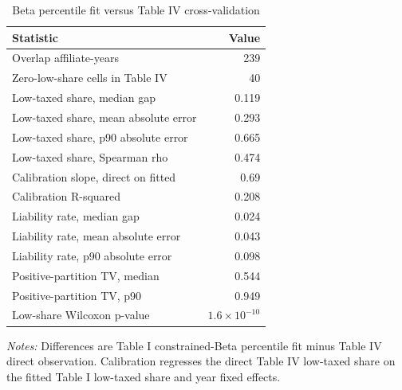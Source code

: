 \begin{table}[H]
\centering
\small
\caption[Beta percentile fit versus Table IV cross-validation]{Beta percentile fit versus Table IV cross-validation}
\label{tab:app_stage1_crossval}
\begin{tabular}{@{}lr@{}}
\toprule
Statistic & Value \\
\midrule
Overlap affiliate-years & 239 \\
Zero-low-share cells in Table IV & 40 \\
Low-taxed share, median gap & 0.119 \\
Low-taxed share, mean absolute error & 0.293 \\
Low-taxed share, p90 absolute error & 0.665 \\
Low-taxed share, Spearman rho & 0.474 \\
Calibration slope, direct on fitted & 0.69 \\
Calibration R-squared & 0.208 \\
Liability rate, median gap & 0.024 \\
Liability rate, mean absolute error & 0.043 \\
Liability rate, p90 absolute error & 0.098 \\
Positive-partition TV, median & 0.544 \\
Positive-partition TV, p90 & 0.949 \\
Low-share Wilcoxon p-value & $1.6 \times 10^{-10}$ \\
\bottomrule
\end{tabular}

\vspace{0.5em}
\begin{minipage}{0.96\textwidth}
\footnotesize\raggedright \textit{Notes:} Differences are Table I constrained-Beta percentile fit minus Table IV direct observation. Calibration regresses the direct Table IV low-taxed share on the fitted Table I low-taxed share and year fixed effects.
\end{minipage}
\end{table}
